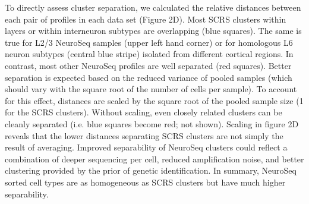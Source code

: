 To directly assess cluster separation, we calculated the relative distances between each pair of profiles in each data set (Figure 2D). Most SCRS clusters within layers or within interneuron subtypes are overlapping (blue squares). The same is true for L2/3 NeuroSeq samples (upper left hand corner) or for homologous L6 neuron subtypes (central blue stripe) isolated from different cortical regions. In contrast, most other NeuroSeq profiles are well separated (red squares). Better separation is expected based on the reduced variance of pooled samples (which should vary with the square root of the number of cells per sample). To account for this effect, distances are scaled by the square root of the pooled sample size (1 for the SCRS clusters). Without scaling, even closely related clusters can be cleanly separated (i.e. blue squares become red; not shown). Scaling in figure 2D reveals that the lower distances separating SCRS clusters are not simply the result of averaging. Improved separability of NeuroSeq clusters could reflect a combination of deeper sequencing per cell, reduced amplification noise, and better clustering provided by the prior of genetic identification. In summary, NeuroSeq sorted cell types are as homogeneous as SCRS clusters but have much higher separability. 

